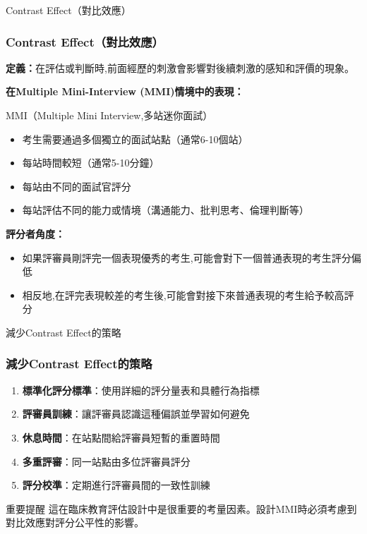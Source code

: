\documentclass[aspectratio=169]{beamer}
\begin{document}
\begin{frame}{Contrast Effect（對比效應）}
\frametitle{Contrast Effect（對比效應）}

\textbf{定義：}在評估或判斷時,前面經歷的刺激會影響對後續刺激的感知和評價的現象。

\vspace{0.5cm}

\textbf{在Multiple Mini-Interview (MMI)情境中的表現：}

\begin{block}{MMI（Multiple Mini Interview,多站迷你面試）}
\begin{itemize}
    \item 考生需要通過多個獨立的面試站點（通常6-10個站）
    \item 每站時間較短（通常5-10分鐘）
    \item 每站由不同的面試官評分
    \item 每站評估不同的能力或情境（溝通能力、批判思考、倫理判斷等）
\end{itemize}
\end{block}

\vspace{0.3cm}

\textbf{評分者角度：}
\begin{itemize}
    \item 如果評審員剛評完一個表現優秀的考生,可能會對下一個普通表現的考生評分偏低
    \item 相反地,在評完表現較差的考生後,可能會對接下來普通表現的考生給予較高評分
\end{itemize}
\end{frame}

\begin{frame}{減少Contrast Effect的策略}
\frametitle{減少Contrast Effect的策略}

\begin{enumerate}
    \item \textbf{標準化評分標準}：使用詳細的評分量表和具體行為指標
    
    \item \textbf{評審員訓練}：讓評審員認識這種偏誤並學習如何避免
    
    \item \textbf{休息時間}：在站點間給評審員短暫的重置時間
    
    \item \textbf{多重評審}：同一站點由多位評審員評分
    
    \item \textbf{評分校準}：定期進行評審員間的一致性訓練
\end{enumerate}

\vspace{0.5cm}

\begin{alertblock}{重要提醒}
這在臨床教育評估設計中是很重要的考量因素。設計MMI時必須考慮到對比效應對評分公平性的影響。
\end{alertblock}
\end{frame}
\end{document}
